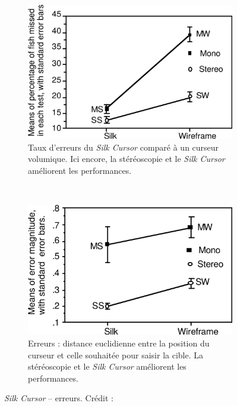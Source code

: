 \begin{appendices}
	\begin{figure}[htbp]
		\begin{subfigure}[t]{0.49\textwidth}
			\centering
			\includegraphics[width=\textwidth]{figures/ch2/silkErrors}
			\caption{Taux d'erreurs du \emph{Silk Cursor} comparé à un curseur volumique. Ici encore, la stéréoscopie et le \emph{Silk Cursor} améliorent les performances.}
			\label{fig:silkErrors}
		\end{subfigure}
		~
		\begin{subfigure}[t]{0.49\textwidth}
			\centering
			\includegraphics[width=\textwidth]{figures/ch2/silkErrorMag}
			\caption{Erreurs : distance euclidienne entre la position du curseur et celle souhaitée pour saisir la cible. La stéréoscopie et le \emph{Silk Cursor} améliorent les performances.}
			\label{fig:silkErrorMag}
		\end{subfigure}
		\caption[\emph{Silk Cursor} -- Occurrences et amplitude des erreurs]{\emph{Silk Cursor} -- erreurs. Crédit : \cite{zhai1994silk}}
		\label{fig:SilkErrorsErrMag}
	\end{figure}
	

\end{appendices}
